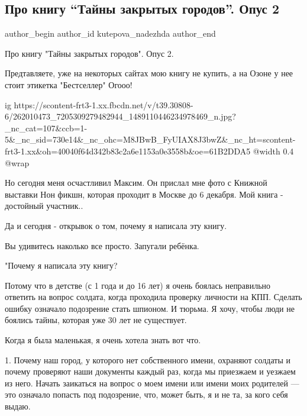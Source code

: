  
 
 
 
 
 
\subsection{Про книгу \enquote{Тайны закрытых городов}. Опус 2}
\label{sec:04_12_2021.fb.kutepova_nadezhda.1.kniga_tajny_zakrytyh_gorodov}
 
\ifcmt
 author_begin
   author_id kutepova_nadezhda
 author_end
\fi

Про книгу "Тайны закрытых городов". Опус 2.

Предтавляете, уже на некоторых сайтах мою книгу не купить, а на Озоне у нее
стоит этикетка "Бестселлер" Огооо!

\ifcmt
  ig https://scontent-frt3-1.xx.fbcdn.net/v/t39.30808-6/262010473_7205309279482944_1489110446234978469_n.jpg?_nc_cat=107&ccb=1-5&_nc_sid=730e14&_nc_ohc=M8JBwB_FyUIAX8J3bwZ&_nc_ht=scontent-frt3-1.xx&oh=40040f64d342b83c2a6e1153a0e3558b&oe=61B2DDA5
  @width 0.4
  @wrap 
\fi

Но сегодня меня осчастливил Максим. Он прислал мне фото с Книжной выставки Нон
фикшн, которая проходит в Москве до 6 декабря. Мой книга - достойный участник..  

Да и сегодня -  открывок о том, почему я написала эту книгу.

Вы удивитесь наколько все просто. Запугали ребёнка.

"Почему я написала эту книгу?

Потому что в детстве (с 1 года и до 16 лет) я очень боялась неправильно
ответить на вопрос солдата, когда проходила проверку личности на КПП. Сделать
ошибку означало подозрение стать шпионом. И тюрьма. Я хочу, чтобы люди не
боялись тайны, которая уже 30 лет не существует.

Когда я была маленькая, я очень хотела знать вот что.

1. Почему наш город, у которого нет собственного имени, охраняют солдаты и
почему проверяют наши документы каждый раз, когда мы приезжаем и уезжаем из
него. Начать заикаться на вопрос о моем имени или имени моих родителей —
это означало попасть под подозрение, что, может быть, я и не та, за кого
себя выдаю. 


